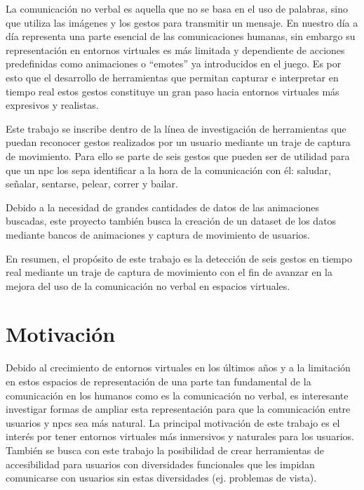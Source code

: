 La comunicación no verbal es aquella que no se basa en el uso de palabras, sino que utiliza las imágenes y los gestos para transmitir un mensaje.
En nuestro día a día representa una parte esencial de las comunicaciones humanas, sin embargo su representación en entornos virtuales es más limitada y dependiente de acciones predefinidas como animaciones o ``emotes'' ya introducidos en el juego.
Es por esto que el desarrollo de herramientas que permitan capturar e interpretar en tiempo real estos gestos constituye un gran paso hacia entornos virtuales más expresivos y realistas.

Este trabajo se inscribe dentro de la línea de investigación de herramientas que puedan reconocer gestos realizados por un usuario mediante un traje de captura de movimiento.
Para ello se parte de seis gestos que pueden ser de utilidad para que un \gls{npc} los sepa identificar a la hora de la comunicación con él: saludar, señalar, sentarse, pelear, correr y bailar.

Debido a la necesidad de grandes cantidades de datos de las animaciones buscadas, este proyecto también busca la creación de un dataset de los datos mediante bancos de animaciones y captura de movimiento de usuarios.

En resumen, el propósito de este trabajo es la detección de seis gestos en tiempo real mediante un traje de captura de movimiento con el fin de avanzar en la mejora del uso de la comunicación no verbal en espacios virtuales.

\section{Motivación}
Debido al crecimiento de entornos virtuales en los últimos años y a la limitación en estos espacios de representación de una parte tan fundamental de la comunicación en los humanos como es la comunicación no verbal, es interesante investigar formas de ampliar esta representación para que la comunicación entre usuarios y \glspl{npc} sea más natural.
La principal motivación de este trabajo es el interés por tener entornos virtuales más inmersivos y naturales para los usuarios. También se busca con este trabajo la posibilidad de crear herramientas de accesibilidad para usuarios con diversidades funcionales que les impidan comunicarse con usuarios sin estas diversidades (ej. problemas de vista).

